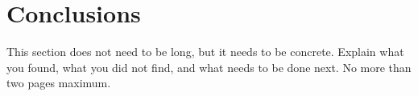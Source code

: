 \cleardoublepage%
\chapter{Conclusions}%

This section does not need to be long, but it needs to be concrete. Explain what you found, what you did not find, and what needs to be done next. No more than two pages maximum. 
